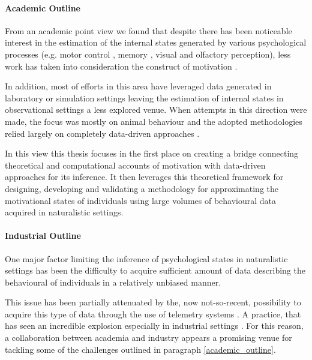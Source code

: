 \paragraph*{Academic Outline}
\label{academic_outline}
From an academic point view we found that despite there has been noticeable interest in the estimation of the internal states generated by various psychological processes (e.g. motor control \cite{gallego2017neural}, memory \cite{derdikman2011manifold, nieh2021geometry}, visual \cite{seung2000manifold, ganmor2015thesaurus} and olfactory \cite{stopfer2003intensity} perception), less work has taken into consideration the construct of motivation \cite{mcclure2003computational, zhang2009neural}. 

In addition, most of efforts in this area have leveraged data generated in laboratory or simulation settings \cite{eyjolfsdottir2016learning, song2017reward, merel2019deep,calhoun2019unsupervised, seung2000manifold, pang2016dimensionality, luxem2020identifying, pereira2020quantifying, mccullough2021unsupervised, shi2021learning} leaving the estimation of internal states in observational settings a less explored venue. When attempts in this direction were made, the focus was mostly on animal behaviour and the adopted methodologies relied largely on completely data-driven approaches \cite{luxem2020identifying,pereira2020quantifying, mccullough2021unsupervised}. 

In this view this thesis focuses in the first place on creating a bridge connecting theoretical and computational accounts of motivation with data-driven approaches for its inference. It then leverages this theoretical framework for designing, developing and validating a methodology for approximating the motivational states of individuals using large volumes of behavioural data acquired in naturalistic settings. 

\paragraph*{Industrial Outline}
\label{industrial_outline}
One major factor limiting the inference of psychological states in naturalistic settings has been the difficulty to acquire sufficient amount of data describing the behavioural of individuals in a relatively unbiased manner. 

This issue has been partially attenuated by the, now not-so-recent, possibility to acquire this type of data through the use of telemetry systems \cite{el2016game, drachen2015behavioral}. A practice, that has seen an incredible explosion especially in industrial settings \cite{el2016game, drachen2015behavioral,EUdataregulations2018}. For this reason, a collaboration between academia and industry appears a promising venue for tackling some of the challenges outlined in paragraph \ref{academic_outline}. 

